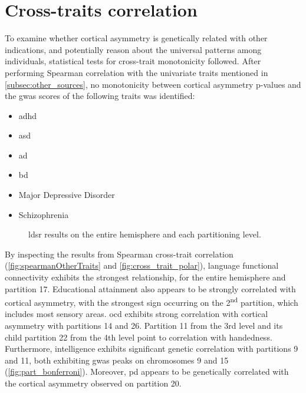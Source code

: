 \section{Cross-traits correlation}
\label{sec:ct-res}
To examine whether cortical asymmetry is genetically related with other indications, and potentially reason about the universal patterns among individuals, statistical tests for cross-trait monotonicity followed. After performing Spearman correlation with the univariate traits mentioned in \autoref{subsec:other_sources}, no monotonicity between cortical asymmetry p-values and the \ac{gwas} scores of the following traits was identified:
\begin{itemize}
	\item{\Acf{adhd}}
	\item{\Acf{asd}}
	\item{\Acf{ad}}
	\item{\Acf{bd}}
	\item{Major Depressive Disorder}
	\item{Schizophrenia}
\end{itemize}



\begin{figure}[H]
	\centering
	\quad
	\caption[LDSR results across partitioning levels]{\Ac{ldsr} results on the entire hemisphere and each partitioning level.}
	\label{fig:ldsr}
\end{figure}


By inspecting the results from Spearman cross-trait correlation (\autoref{fig:spearmanOtherTraits} and \ref{fig:cross_trait_polar}), language functional connectivity exhibits the strongest relationship, for the entire hemisphere and partition 17.  Educational attainment also appears to be strongly correlated with cortical asymmetry, with the strongest sign occurring on the 2\textsuperscript{nd} partition, which includes most sensory areas. \Ac{ocd} exhibits strong correlation with cortical asymmetry with partitions 14 and 26. 
Partition 11 from the 3rd level and its child partition 22 from the 4th level point to correlation with handedness. Furthermore, intelligence exhibits significant genetic correlation with partitions 9 and 11, both exhibiting \ac{gwas} peaks on chromosomes 9 and 15 (\autoref{fig:part_bonferroni}). Moreover, \ac{pd} appears to be genetically correlated with the cortical asymmetry observed on partition 20.

